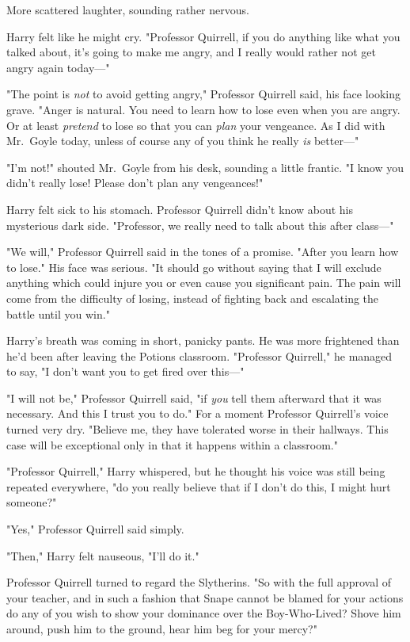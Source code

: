 More scattered laughter, sounding rather nervous.

Harry felt like he might cry. "Professor Quirrell, if you do anything like what
you talked about, it's going to make me angry, and I really would rather not
get angry again today\mbox{---}"

"The point is \emph{not} to avoid getting angry," Professor Quirrell said, his
face looking grave. "Anger is natural. You need to learn how to lose even when
you are angry. Or at least \emph{pretend} to lose so that you can \emph{plan}
your vengeance. As I did with Mr.~Goyle today, unless of course any of you
think he really \emph{is} better\mbox{---}"

"I'm not!" shouted Mr.~Goyle from his desk, sounding a little frantic. "I know
you didn't really lose! Please don't plan any vengeances!"

Harry felt sick to his stomach. Professor Quirrell didn't know about his
mysterious dark side. "Professor, we really need to talk about this after
class\mbox{---}"

"We will," Professor Quirrell said in the tones of a promise. "After you learn
how to lose." His face was serious. "It should go without saying that I will
exclude anything which could injure you or even cause you significant pain. The
pain will come from the difficulty of losing, instead of fighting back and
escalating the battle until you win."

Harry's breath was coming in short, panicky pants. He was more frightened than
he'd been after leaving the Potions classroom. "Professor Quirrell," he managed
to say, "I don't want you to get fired over this\mbox{---}"

"I will not be," Professor Quirrell said, "if \emph{you} tell them afterward
that it was necessary. And this I trust you to do." For a moment Professor
Quirrell's voice turned very dry. "Believe me, they have tolerated worse in
their hallways. This case will be exceptional only in that it happens within a
classroom."

"Professor Quirrell," Harry whispered, but he thought his voice was still being
repeated everywhere, "do you really believe that if I don't do this, I might
hurt someone?"

"Yes," Professor Quirrell said simply.

"Then," Harry felt nauseous, "I'll do it."

Professor Quirrell turned to regard the Slytherins. "So{\el} with the full
approval of your teacher, and in such a fashion that Snape cannot be blamed for
your actions{\el} do any of you wish to show your dominance over the
Boy-Who-Lived? Shove him around, push him to the ground, hear him beg for your
mercy?"

